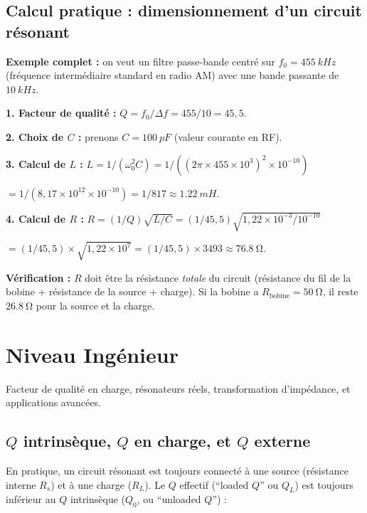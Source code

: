 \documentclass[12pt,a4paper,twoside]{book}
\begin{document}
\subsection{Calcul pratique : dimensionnement d'un circuit résonant}

\begin{pratique}
\textbf{Exemple complet :} on veut un filtre passe-bande centré sur $f_0 = \SI{455}{kHz}$ (fréquence intermédiaire standard en radio AM) avec une bande passante de $\SI{10}{kHz}$.

\textbf{1. Facteur de qualité :} $Q = f_0/\Delta f = 455/10 = 45{,}5$.

\textbf{2. Choix de $C$ :} prenons $C = \SI{100}{pF}$ (valeur courante en RF).

\textbf{3. Calcul de $L$ :} $L = 1/(\omega_0^2 C) = 1/((2\pi\times455\times10^3)^2\times10^{-10})$

$= 1/(8{,}17\times10^{12}\times10^{-10}) = 1/817 \approx \SI{1.22}{mH}$.

\textbf{4. Calcul de $R$ :} $R = (1/Q)\sqrt{L/C} = (1/45{,}5)\sqrt{1{,}22\times10^{-3}/10^{-10}}$

$= (1/45{,}5)\times\sqrt{1{,}22\times10^7} = (1/45{,}5)\times3493 \approx \SI{76.8}{\ohm}$.

\textbf{Vérification :} $R$ doit être la résistance \textit{totale} du circuit (résistance du fil de la bobine + résistance de la source + charge). Si la bobine a $R_{\text{bobine}} = \SI{50}{\ohm}$, il reste $\SI{26.8}{\ohm}$ pour la source et la charge.
\end{pratique}

\section{Niveau Ingénieur}

\begin{ingenieur}
Facteur de qualité en charge, résonateurs réels, transformation d'impédance, et applications avancées.
\end{ingenieur}

\subsection{$Q$ intrinsèque, $Q$ en charge, et $Q$ externe}

En pratique, un circuit résonant est toujours connecté à une source (résistance interne $R_s$) et à une charge ($R_L$). Le $Q$ effectif (``loaded $Q$'' ou $Q_L$) est toujours inférieur au $Q$ intrinsèque ($Q_0$, ou ``unloaded $Q$'') :
\end{document}
